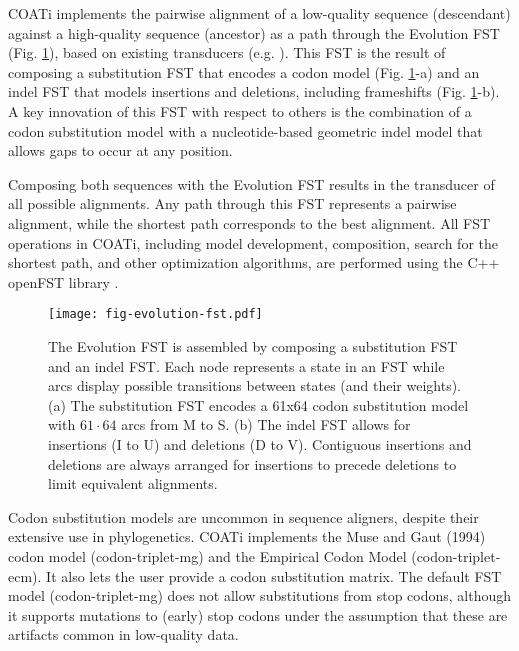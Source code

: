 COATi implements the pairwise alignment of a low-quality sequence (descendant)  against a high-quality sequence (ancestor) as a path through the Evolution FST (Fig. \ref{fig:evolution-fst}), based on existing transducers (e.g. \cite{holmes2001evolutionary}).
This FST is the result of composing a substitution FST that encodes a codon model (Fig. \ref{fig:evolution-fst}-a) and an indel FST that models insertions and deletions, including frameshifts (Fig. \ref{fig:evolution-fst}-b).
A key innovation of this FST with respect to others is the combination of a codon substitution model with a nucleotide-based geometric indel model that allows gaps to occur at any position.

Composing both sequences with the Evolution FST results in the transducer of all possible alignments.
Any path through this FST represents a pairwise alignment, while the shortest path corresponds to the best alignment.
All FST operations in COATi, including model development, composition, search for the shortest path, and other optimization algorithms, are performed using the C++ openFST library \parencite{allauzen2007openfst}.

\begin{figure}[h!]
\begin{framed}
\centering
    \texttt{[image: fig-evolution-fst.pdf]}
    \caption{The Evolution FST is assembled by composing a substitution FST and
    an indel FST. Each node represents a state in an FST while arcs display
    possible transitions between states (and their weights). (a) The
    substitution FST encodes a 61x64 codon substitution model with $61\cdot 64$ arcs
    from M to S. (b) The indel FST allows for insertions (I to U) and deletions
    (D to V). Contiguous insertions and deletions are always arranged for
    insertions to precede deletions to limit equivalent alignments.}
    \label{fig:evolution-fst}
\end{framed}
\end{figure}

Codon substitution models are uncommon in sequence aligners, despite their extensive use in phylogenetics.
COATi implements the Muse and Gaut (1994) codon model (codon-triplet-mg) and the Empirical Codon Model \parencite{kosiol_ECM_2007} (codon-triplet-ecm).
It also lets the user provide a codon substitution matrix.
The default FST model (codon-triplet-mg) does not allow substitutions from stop codons, although it supports mutations to (early) stop codons under the assumption that these are artifacts common in low-quality data.

